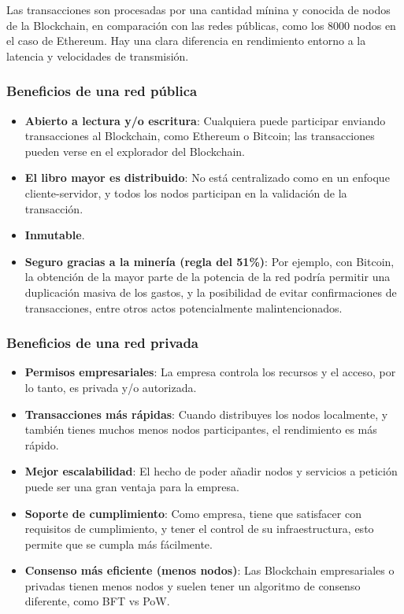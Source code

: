 \noindent Las transacciones son procesadas por una cantidad mínina y conocida de nodos de la Blockchain, en comparación 
con las redes públicas, como los 8000 nodos en el caso de Ethereum. Hay una clara diferencia en rendimiento entorno a 
la latencia y velocidades de transmisión.

\subsubsection*{Beneficios de una red pública}

\begin{itemize}
\item \textbf{Abierto a lectura y/o escritura}: Cualquiera puede participar enviando transacciones al Blockchain, como 
Ethereum o Bitcoin; las transacciones pueden verse en el explorador del Blockchain.

\item \textbf{El libro mayor es distribuido}: No está centralizado como en un enfoque cliente-servidor, y todos los 
nodos participan en la validación de la transacción.

\item \textbf{Inmutable}.

\item \textbf{Seguro gracias a la minería (regla del 51\%)}: Por ejemplo, con Bitcoin, la obtención de la mayor parte 
de la potencia de la red podría permitir una duplicación masiva de los gastos, y la posibilidad de evitar 
confirmaciones de transacciones, entre otros actos potencialmente malintencionados.
\end{itemize}

\subsubsection*{Beneficios de una red privada}

\begin{itemize}
\item \textbf{Permisos empresariales}: La empresa controla los recursos y el acceso, por lo tanto, es privada y/o 
autorizada.

\item \textbf{Transacciones más rápidas}: Cuando distribuyes los nodos localmente, y también tienes muchos menos nodos 
participantes, el rendimiento es más rápido.

\item \textbf{Mejor escalabilidad}: El hecho de poder añadir nodos y servicios a petición puede ser una gran ventaja 
para la empresa.

\item \textbf{Soporte de cumplimiento}: Como empresa, tiene que satisfacer con requisitos de cumplimiento, y tener el 
control de su infraestructura, esto permite que se cumpla más fácilmente.

\item \textbf{Consenso más eficiente (menos nodos)}: Las Blockchain empresariales o privadas tienen menos nodos y 
suelen tener un algoritmo de consenso diferente, como BFT vs PoW.
\end{itemize}

